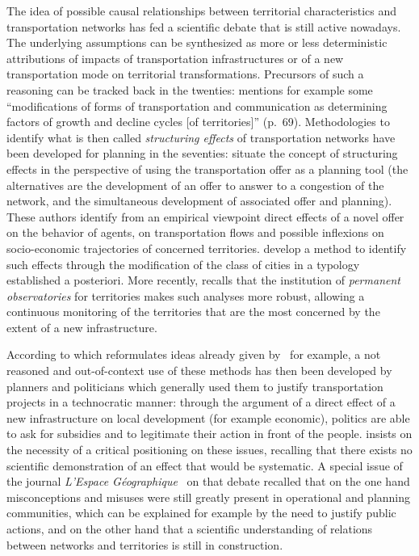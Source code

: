 \documentclass[11pt]{article}
\begin{document}
The idea of possible causal relationships between territorial characteristics and transportation networks has fed a scientific debate that is still active nowadays. The underlying assumptions can be synthesized as more or less deterministic attributions of impacts of transportation infrastructures or of a new transportation mode on territorial transformations. Precursors of such a reasoning can be tracked back in the twenties: \cite{burgess1925city} mentions for example some ``modifications of forms of transportation and communication as determining factors of growth and decline cycles [of territories]'' (p.~69). Methodologies to identify what is then called \emph{structuring effects} of transportation networks have been developed for planning in the seventies: \cite{bonnafous1974methodologies} situate the concept of structuring effects in the perspective of using the transportation offer as a planning tool (the alternatives are the development of an offer to answer to a congestion of the network, and the simultaneous development of associated offer and planning). These authors identify from an empirical viewpoint direct effects of a novel offer on the behavior of agents, on transportation flows and possible inflexions on socio-economic trajectories of concerned territories. \cite{bonnafous1974detection} develop a method to identify such effects through the modification of the class of cities in a typology established a posteriori. More recently, \cite{bonnafous2014observatoires} recalls that the institution of \emph{permanent observatories} for territories makes such analyses more robust, allowing a continuous monitoring of the territories that are the most concerned by the extent of a new infrastructure.

According to \cite{offner1993effets} which reformulates ideas already given by~\cite{franccois1977autoroutes} for example, a not reasoned and out-of-context use of these methods has then been developed by planners and politicians which generally used them to justify transportation projects in a technocratic manner: through the argument of a direct effect of a new infrastructure on local development (for example economic), politics are able to ask for subsidies and to legitimate their action in front of the people. \cite{offner1993effets} insists on the necessity of a critical positioning on these issues, recalling that there exists no scientific demonstration of an effect that would be systematic. A special issue of the journal \emph{L'Espace Géographique}~\citep{espacegeo2014effets} on that debate recalled that on the one hand misconceptions and misuses were still greatly present in operational and planning communities, which can be explained for example by the need to justify public actions, and on the other hand that a scientific understanding of relations between networks and territories is still in construction. 
\end{document}
